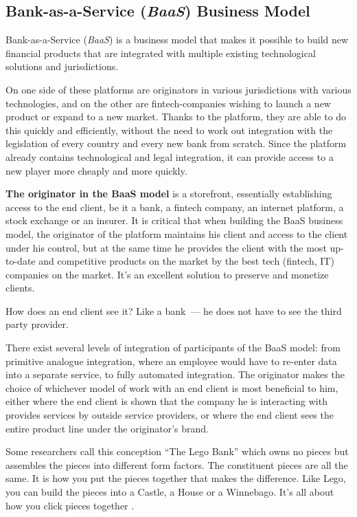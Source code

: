 \documentclass{article}
\begin{document}
\begin{multicols}{2}
\subsection{Bank-as-a-Service (\textit{BaaS}) Business Model}

Bank-as-a-Service (\textit{BaaS}) is a business model that makes it possible to build new financial products that are integrated with multiple existing technological solutions and jurisdictions. 

On one side of these platforms are originators in various jurisdictions with various technologies, and on the other are fintech-companies wishing to launch a new product or expand to a new market. Thanks to the platform, they are able to do this quickly and efficiently, without the need to work out integration with the legislation of every country and every new bank from scratch. Since the platform already contains technological and legal integration, it can provide access to a new player more cheaply and more quickly. 

\textbf{The originator in the BaaS model} is a storefront, essentially establishing access to the end client, be it a bank, a fintech company, an internet platform, a stock exchange or an insurer. It is critical that when building the BaaS business model, the originator of the platform maintains his client and access to the client under his control, but at the same time he provides the client with the most up-to-date and competitive products on the market by the best tech (fintech, IT) companies on the market. It’s an excellent solution to preserve and monetize clients.

How does an end client see it? Like a bank~--- he does not have to see the third party provider.

There exist several levels of integration of participants of the BaaS model: from primitive analogue integration, where an employee would have to re-enter data into a separate service, to fully automated integration. The originator makes the choice of whichever model of work with an end client is most beneficial to him, either where the end client is shown that the company he is interacting with provides services by outside service providers, or where the end client sees the entire product line under the originator’s brand.

Some researchers call this conception \enquote{The Lego Bank} which owns no pieces but assembles the pieces into different form factors.  The constituent pieces are all the same.  It is how you put the pieces together that makes the difference.  Like Lego, you can build the pieces into a Castle, a House or a Winnebago.  It’s all about how you click pieces together \cite{skinner2017baas}.


\end{multicols}
\end{document}
